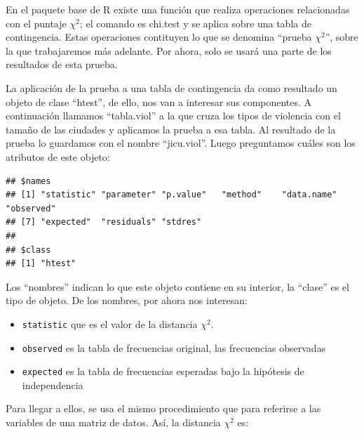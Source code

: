 \documentclass[]{book}
\newenvironment{Shaded}{\begin{snugshade}}{\end{snugshade}}
\newcommand{\KeywordTok}[1]{\textcolor[rgb]{0.13,0.29,0.53}{\textbf{#1}}}
\newcommand{\NormalTok}[1]{#1}
\newcommand{\OperatorTok}[1]{\textcolor[rgb]{0.81,0.36,0.00}{\textbf{#1}}}
\newcommand{\StringTok}[1]{\textcolor[rgb]{0.31,0.60,0.02}{#1}}
\begin{document}
En el paquete base de R existe una función que realiza operaciones relacionadas con el puntaje \(\chi^{2}\); el comando es chi.test y se aplica sobre una tabla de contingencia. Estas operaciones contituyen lo que se denomina ``prueba \(\chi^{2}\)'', sobre la que trabajaremos más adelante. Por ahora, solo se usará una parte de los resultados de esta prueba.

La aplicación de la prueba a una tabla de contingencia da como resultado un objeto de clase ``htest'', de ello, nos van a interesar sus componentes. A continuación llamamos ``tabla.viol'' a la que cruza los tipos de violencia con el tamaño de las ciudades y aplicamos la prueba a esa tabla. Al resultado de la prueba lo guardamos con el nombre ``jicu.viol''. Luego preguntamos cuáles son los atributos de este objeto:

\begin{Shaded}
\end{Shaded}

\begin{verbatim}
## $names
## [1] "statistic" "parameter" "p.value"   "method"    "data.name" "observed" 
## [7] "expected"  "residuals" "stdres"   
## 
## $class
## [1] "htest"
\end{verbatim}

Los ``nombres'' indican lo que este objeto contiene en su interior, la ``clase'' es el tipo de objeto. De los nombres, por ahora nos interesan:

\begin{itemize}
\item
  \texttt{statistic} que es el valor de la distancia \(\chi^{2}\).
\item
  \texttt{observed} es la tabla de frecuencias original, las frecuencias observadas
\item
  \texttt{expected} es la tabla de frecuencias esperadas bajo la hipótesis de independencia
\end{itemize}

Para llegar a ellos, se usa el mismo procedimiento que para referirse a las variables de una matriz de datos. Así, la distancia \(\chi^{2}\) es:
\end{document}
